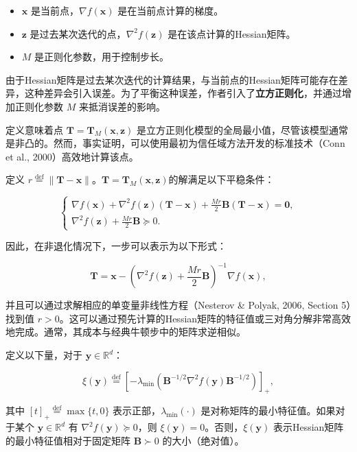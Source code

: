 \documentclass[a4paper,twoside,AutoFakeBold]{article}
\theoremstyle{definition}
\begin{document}
\begin{itemize}
    \item \(\mathbf{x}\) 是当前点，\(\nabla f(\mathbf{x})\) 是在当前点计算的梯度。
    \item \(\mathbf{z}\) 是过去某次迭代的点，\(\nabla^{2}f(\mathbf{z})\) 是在该点计算的Hessian矩阵。
    \item \(M\) 是正则化参数，用于控制步长。
\end{itemize}

由于Hessian矩阵是过去某次迭代的计算结果，与当前点的Hessian矩阵可能存在差异，这种差异会引入误差。为了平衡这种误差，作者引入了\textbf{立方正则化}，并通过增加正则化参数 \(M\) 来抵消误差的影响。

定义意味着点 \(\mathbf{T} = \mathbf{T}_{M}(\mathbf{x},\mathbf{z})\) 是立方正则化模型的全局最小值，尽管该模型通常是非凸的。然而，事实证明，可以使用最初为信任域方法开发的标准技术（Conn et al., 2000）高效地计算该点。

定义 \(r \stackrel{\text{def}}{=} \|\mathbf{T} - \mathbf{x}\|\)。\(\mathbf{T} = \mathbf{T}_{M}(\mathbf{x},\mathbf{z})\)的解满足以下平稳条件：

\[
\begin{cases}
\nabla f(\mathbf{x}) + \nabla^{2}f(\mathbf{z})(\mathbf{T} - \mathbf{x}) + \frac{M r}{2} \mathbf{B}(\mathbf{T} - \mathbf{x}) = \mathbf{0}, \\
\nabla^{2}f(\mathbf{z}) + \frac{M r}{2} \mathbf{B} \succeq 0.
\end{cases}
\]

因此，在非退化情况下，一步可以表示为以下形式：

\[
\mathbf{T} = \mathbf{x} - \left( \nabla^{2}f(\mathbf{z}) + \frac{M r}{2} \mathbf{B} \right)^{-1} \nabla f(\mathbf{x}),
\]

并且可以通过求解相应的单变量非线性方程（Nesterov \& Polyak, 2006, Section 5）找到值 \(r > 0\)。这可以通过预先计算的Hessian矩阵的特征值或三对角分解非常高效地完成。通常，其成本与经典牛顿步中的矩阵求逆相似。

定义以下量，对于 \(\mathbf{y} \in \mathbb{R}^{d}\)：

\[
\xi(\mathbf{y}) \stackrel{\text{def}}{=} \left[ -\lambda_{\min} \left( \mathbf{B}^{-1/2} \nabla^{2}f(\mathbf{y}) \mathbf{B}^{-1/2} \right) \right]_{+},
\]

其中 \([t]_{+} \stackrel{\text{def}}{=} \max\{t, 0\}\) 表示正部，\(\lambda_{\min}(\cdot)\) 是对称矩阵的最小特征值。如果对于某个 \(\mathbf{y} \in \mathbb{R}^{d}\) 有 \(\nabla^{2}f(\mathbf{y}) \succeq 0\)，则 \(\xi(\mathbf{y}) = 0\)。否则，\(\xi(\mathbf{y})\) 表示Hessian矩阵的最小特征值相对于固定矩阵 \(\mathbf{B} \succ 0\) 的大小（绝对值）。
\end{document}
